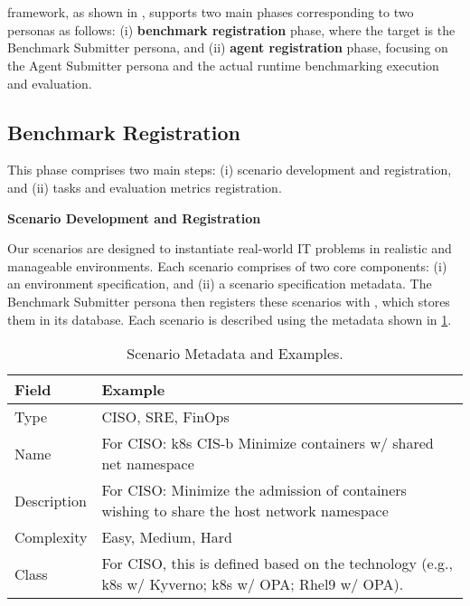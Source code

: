 \section{\bench}
\label{appx:framework}

\bench framework, as shown in , supports two main phases corresponding to two personas as follows: (i) \textbf{benchmark registration} phase, where the target is the Benchmark Submitter persona, and (ii) \textbf{agent registration} phase, focusing on the Agent Submitter persona and the actual runtime benchmarking execution and evaluation.

\subsection{Benchmark Registration} 
This phase comprises two main steps: (i) scenario development and registration, and (ii) tasks and evaluation metrics registration.

\textbf{Scenario Development and Registration}

Our scenarios are designed to instantiate real-world IT problems in realistic and manageable environments. Each scenario comprises of two core components: (i) an environment specification, and (ii) a scenario specification metadata. 
The Benchmark Submitter persona then registers these scenarios with \bench, which stores them in its database. 
Each scenario is described using the metadata shown in \cref{ss:bench:tab:scenario_fields}.

\begin{table}[htbp]
\centering
\begin{threeparttable}
\centering
\caption{Scenario Metadata and Examples.}
\label{ss:bench:tab:scenario_fields}
\begin{tabular}{@{}lp{5cm}}
\toprule
\textbf{Field} & \textbf{Example} \\
\midrule
Type & CISO, SRE, FinOps \\
Name & For CISO: k8s CIS-b Minimize containers w/ shared net namespace \\
Description & For CISO: Minimize the admission of containers wishing to share the host network namespace \\
Complexity & Easy, Medium, Hard \\
Class &  
                  For CISO, this is defined based on the technology (e.g., k8s w/ Kyverno; k8s w/ OPA; Rhel9 w/ OPA). 
                  \\
\bottomrule
\end{tabular}
\end{threeparttable}
\end{table}


